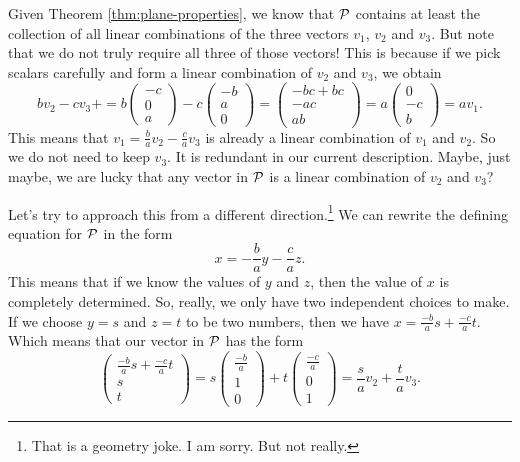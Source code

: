 \documentclass[00-livre-main.tex]{subfiles}
\begin{document}
Given Theorem \ref{thm:plane-properties}, we know that $\mathcal{P}$ contains at least the collection of all linear combinations of the three vectors $v_1$, $v_2$ and $v_3$. 
But note that we do not truly require all three of those vectors! This is because if we pick scalars carefully and form a linear combination of $v_2$ and $v_3$, we obtain
\[
bv_2 -cv_3 + = b\begin{pmatrix} -c\\ 0 \\ a \end{pmatrix} - c\begin{pmatrix} -b \\ a\\ 0 \end{pmatrix} = \begin{pmatrix} -bc+bc \\ -ac \\ ab\end{pmatrix} 
=a\begin{pmatrix} 0\\ -c \\ b  \end{pmatrix} = a v_1.
\]
This means that $v_1 = \frac{b}{a} v_2 - \frac{c}{a} v_3$ is already a linear combination of $v_1$ and $v_2$. So we do not need to keep $v_3$. It is redundant in our current description. Maybe, just maybe, we are lucky that any vector in $\mathcal{P}$ is a linear combination of $v_2$ and $v_3$?




Let's try to approach this from a different direction.\footnote{That is a geometry joke. I am sorry. But not really.} We can rewrite the defining equation for $\mathcal{P}$ in 
the form
\[
x = -\frac{b}{a}y -\frac{c}{a}z.
\]
This means that if we know the values of $y$ and $z$, then the value of $x$ is completely determined. So, really, we only have two independent choices to make. If we choose $y=s$ and $z=t$ to be two numbers, then we have $x = \frac{-b}{a} s + \frac{-c}{a} t$. Which means that our vector in $\mathcal{P}$ has the form
\[
\begin{pmatrix} \frac{-b}{a} s + \frac{-c}{a} t \\ s \\ t \end{pmatrix} 
= s\begin{pmatrix}  \frac{-b}{a} \\1 \\ 0 \end{pmatrix} 
+ t\begin{pmatrix} \frac{-c}{a} \\ 0 \\ 1 \end{pmatrix} = \frac{s}{a} v_2 + \frac{t}{a} v_3.
\]
\end{document}
